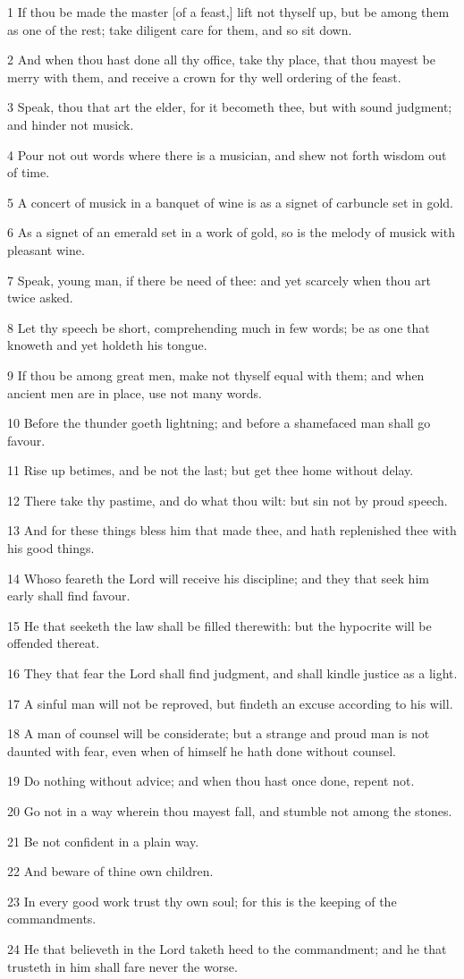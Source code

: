 \par 1 If thou be made the master [of a feast,] lift not thyself up, but be among them as one of the rest; take diligent care for them, and so sit down.
\par 2 And when thou hast done all thy office, take thy place, that thou mayest be merry with them, and receive a crown for thy well ordering of the feast.
\par 3 Speak, thou that art the elder, for it becometh thee, but with sound judgment; and hinder not musick.
\par 4 Pour not out words where there is a musician, and shew not forth wisdom out of time.
\par 5 A concert of musick in a banquet of wine is as a signet of carbuncle set in gold.
\par 6 As a signet of an emerald set in a work of gold, so is the melody of musick with pleasant wine.
\par 7 Speak, young man, if there be need of thee: and yet scarcely when thou art twice asked.
\par 8 Let thy speech be short, comprehending much in few words; be as one that knoweth and yet holdeth his tongue.
\par 9 If thou be among great men, make not thyself equal with them; and when ancient men are in place, use not many words.
\par 10 Before the thunder goeth lightning; and before a shamefaced man shall go favour.
\par 11 Rise up betimes, and be not the last; but get thee home without delay.
\par 12 There take thy pastime, and do what thou wilt: but sin not by proud speech.
\par 13 And for these things bless him that made thee, and hath replenished thee with his good things.
\par 14 Whoso feareth the Lord will receive his discipline; and they that seek him early shall find favour.
\par 15 He that seeketh the law shall be filled therewith: but the hypocrite will be offended thereat.
\par 16 They that fear the Lord shall find judgment, and shall kindle justice as a light.
\par 17 A sinful man will not be reproved, but findeth an excuse according to his will.
\par 18 A man of counsel will be considerate; but a strange and proud man is not daunted with fear, even when of himself he hath done without counsel.
\par 19 Do nothing without advice; and when thou hast once done, repent not.
\par 20 Go not in a way wherein thou mayest fall, and stumble not among the stones.
\par 21 Be not confident in a plain way.
\par 22 And beware of thine own children.
\par 23 In every good work trust thy own soul; for this is the keeping of the commandments.
\par 24 He that believeth in the Lord taketh heed to the commandment; and he that trusteth in him shall fare never the worse.

